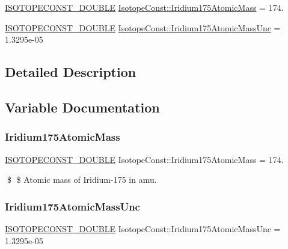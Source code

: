 \begin{DoxyCompactItemize}
\item 
\mbox{\hyperlink{group___isotope_const-_macros_ga8f45a7272ce02c0b4c65c44636ed719a}{I\+S\+O\+T\+O\+P\+E\+C\+O\+N\+S\+T\+\_\+\+D\+O\+U\+B\+LE}} \mbox{\hyperlink{group___isotope_const-_iridium-_ir175_ga95ecabdda5ed1aeaeaf283f3d4044ce3}{Isotope\+Const\+::\+Iridium175\+Atomic\+Mass}} = 174.
\item 
\mbox{\hyperlink{group___isotope_const-_macros_ga8f45a7272ce02c0b4c65c44636ed719a}{I\+S\+O\+T\+O\+P\+E\+C\+O\+N\+S\+T\+\_\+\+D\+O\+U\+B\+LE}} \mbox{\hyperlink{group___isotope_const-_iridium-_ir175_gac6df48d63b1edf3b3284b7db94a1e96d}{Isotope\+Const\+::\+Iridium175\+Atomic\+Mass\+Unc}} = 1.\+3295e-\/05
\end{DoxyCompactItemize}


\subsection{Detailed Description}


\subsection{Variable Documentation}
\mbox{\label{group___isotope_const-_iridium-_ir175_ga95ecabdda5ed1aeaeaf283f3d4044ce3}} 
\subsubsection{\texorpdfstring{Iridium175\+Atomic\+Mass}{Iridium175AtomicMass}}
{\footnotesize\ttfamily \mbox{\hyperlink{group___isotope_const-_macros_ga8f45a7272ce02c0b4c65c44636ed719a}{I\+S\+O\+T\+O\+P\+E\+C\+O\+N\+S\+T\+\_\+\+D\+O\+U\+B\+LE}} Isotope\+Const\+::\+Iridium175\+Atomic\+Mass = 174.}

\$ \$ Atomic mass of Iridium-\/175 in amu. \mbox{\label{group___isotope_const-_iridium-_ir175_gac6df48d63b1edf3b3284b7db94a1e96d}} 
\subsubsection{\texorpdfstring{Iridium175\+Atomic\+Mass\+Unc}{Iridium175AtomicMassUnc}}
{\footnotesize\ttfamily \mbox{\hyperlink{group___isotope_const-_macros_ga8f45a7272ce02c0b4c65c44636ed719a}{I\+S\+O\+T\+O\+P\+E\+C\+O\+N\+S\+T\+\_\+\+D\+O\+U\+B\+LE}} Isotope\+Const\+::\+Iridium175\+Atomic\+Mass\+Unc = 1.\+3295e-\/05}

